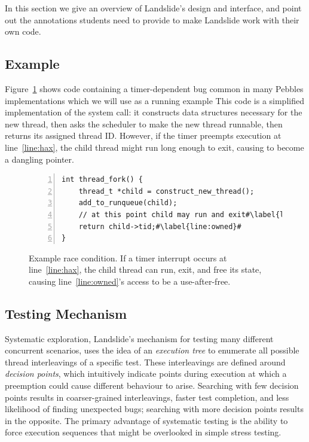 In this section we give an overview of Landslide's design and interface, and point out the annotations students need to provide to make Landslide work with their own code.

\subsection{Example}

Figure~\ref{fig:threadfork} shows code containing a timer-dependent bug common in many Pebbles implementations which we will use as a running example
This code is a simplified implementation of the  system call: it constructs data structures necessary for the new thread, then asks the scheduler to make the new thread runnable, then returns its assigned thread ID.
However, if the timer preempts execution at line~\ref{line:hax}, the child thread might run long enough to exit, causing  to become a dangling pointer.

\begin{figure}[t]
\small
\begin{lstlisting}[numbers=left]
int thread_fork() {
	thread_t *child = construct_new_thread();
	add_to_runqueue(child);
	// at this point child may run and exit#\label{line:hax}#
	return child->tid;#\label{line:owned}#
}
\end{lstlisting}
\caption{Example race condition. If a timer interrupt occurs at line~\ref{line:hax}, the child thread can run, exit, and free its state, causing line~\ref{line:owned}'s access to be a use-after-free.}
\label{fig:threadfork}
\end{figure}

\subsection{Testing Mechanism}

Systematic exploration, Landslide's mechanism for testing many different concurrent scenarios, uses the idea of an {\em execution tree} to enumerate all possible thread interleavings of a specific test. These interleavings are defined around {\em decision points}, which intuitively indicate points during execution at which a preemption could cause different behaviour to arise.
Searching with few decision points results in coarser-grained interleavings, faster test completion, and less likelihood of finding unexpected bugs; searching with more decision points results in the opposite.
The primary advantage of systematic testing is the ability to force execution sequences that might be overlooked in simple stress testing.

